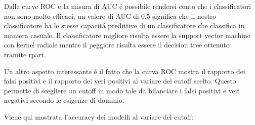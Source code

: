 Dalle curve ROC e la misura di AUC é possibile rendersi conto che i
classificatori non sono molto efficaci, un valore di AUC di 0.5
significa che il nostro classificatore ha le stesse capacitá
predittive di un classificatore che classifica in maniera casuale. Il
classificatore migliore risulta essere la support vector machine con
kernel radiale mentre il peggiore risulta essere il decision tree
ottenuto tramite rpart.

Un altro aspetto interessante è il fatto che la curva ROC mostra il rapporto dei falsi positivi e il rapporto dei veri positivi al variare del cutoff scelto. Questo permette di scegliere un cutoff in modo tale da bilanciare i falsi positivi e veri negativi secondo le esigenze di dominio.

Viene qui mostrata l'accuracy dei modelli al variare del cutoff:

